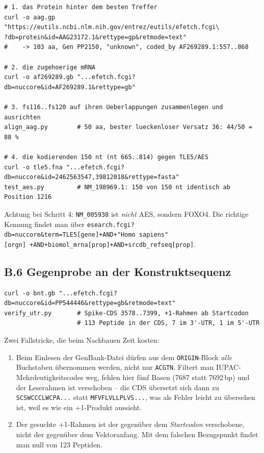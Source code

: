 \documentclass[11pt,a4paper]{article}
\begin{document}
\begin{lstlisting}
# 1. das Protein hinter dem besten Treffer
curl -o aag.gp "https://eutils.ncbi.nlm.nih.gov/entrez/eutils/efetch.fcgi\
?db=protein&id=AAG23172.1&rettype=gp&retmode=text"
#    -> 103 aa, Gen PP2150, "unknown", coded_by AF269289.1:557..868

# 2. die zugehoerige mRNA
curl -o af269289.gb "...efetch.fcgi?db=nuccore&id=AF269289.1&rettype=gb"

# 3. fs116..fs120 auf ihren Ueberlappungen zusammenlegen und ausrichten
align_aag.py        # 50 aa, bester lueckenloser Versatz 36: 44/50 = 88 %

# 4. die kodierenden 150 nt (nt 665..814) gegen TLE5/AES
curl -o tle5.fna "...efetch.fcgi?db=nuccore&id=2462563547,39812018&rettype=fasta"
test_aes.py         # NM_198969.1: 150 von 150 nt identisch ab Position 1216
\end{lstlisting}

Achtung bei Schritt 4: \texttt{NM\_005938} ist \emph{nicht} AES, sondern
FOXO4. Die richtige Kennung findet man über
\texttt{esearch.fcgi?db=nuccore\&term=TLE5[gene]+AND+"Homo sapiens"[orgn]\
+AND+biomol\_mrna[prop]+AND+srcdb\_refseq[prop]}.

\subsection*{B.6 Gegenprobe an der Konstruktsequenz}

\begin{lstlisting}
curl -o bnt.gb "...efetch.fcgi?db=nuccore&id=PP544446&rettype=gb&retmode=text"
verify_utr.py       # Spike-CDS 3578..7399, +1-Rahmen ab Startcodon
                    # 113 Peptide in der CDS, 7 im 3'-UTR, 1 im 5'-UTR
\end{lstlisting}

Zwei Fallstricke, die beim Nachbauen Zeit kosten:

\begin{enumerate}
\item Beim Einlesen der GenBank-Datei dürfen aus dem \texttt{ORIGIN}-Block
      \emph{alle} Buchstaben übernommen werden, nicht nur \texttt{ACGTN}.
      Filtert man IUPAC-Mehrdeutigkeitscodes weg, fehlen hier fünf Basen
      (7687 statt 7692\,bp) und der Leserahmen ist verschoben -- die CDS
      übersetzt sich dann zu \texttt{SCSWCCCLWCPA...} statt
      \texttt{MFVFLVLLPLVS...}, was als Fehler leicht zu übersehen ist, weil
      es wie ein +1-Produkt aussieht.
\item Der gesuchte +1-Rahmen ist der gegenüber dem \emph{Startcodon}
      verschobene, nicht der gegenüber dem Vektoranfang. Mit dem falschen
      Bezugspunkt findet man null von 123 Peptiden.
\end{enumerate}
\end{document}
